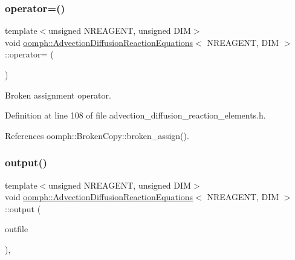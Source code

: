 \subsubsection{\texorpdfstring{operator=()}{operator=()}}
{\footnotesize\ttfamily template$<$unsigned N\+R\+E\+A\+G\+E\+NT, unsigned D\+IM$>$ \\
void \hyperlink{classoomph_1_1AdvectionDiffusionReactionEquations}{oomph\+::\+Advection\+Diffusion\+Reaction\+Equations}$<$ N\+R\+E\+A\+G\+E\+NT, D\+IM $>$\+::operator= (\begin{DoxyParamCaption}\item[{const \hyperlink{classoomph_1_1AdvectionDiffusionReactionEquations}{Advection\+Diffusion\+Reaction\+Equations}$<$ N\+R\+E\+A\+G\+E\+NT, D\+IM $>$ \&}]{ }\end{DoxyParamCaption})\hspace{0.3cm}{\ttfamily [inline]}}



Broken assignment operator. 



Definition at line 108 of file advection\+\_\+diffusion\+\_\+reaction\+\_\+elements.\+h.



References oomph\+::\+Broken\+Copy\+::broken\+\_\+assign().

\mbox{\label{classoomph_1_1AdvectionDiffusionReactionEquations_a70be6733b56f27104a4a849c296b5b62}} 
\subsubsection{\texorpdfstring{output()}{output()}\hspace{0.1cm}{\footnotesize\ttfamily [1/4]}}
{\footnotesize\ttfamily template$<$unsigned N\+R\+E\+A\+G\+E\+NT, unsigned D\+IM$>$ \\
void \hyperlink{classoomph_1_1AdvectionDiffusionReactionEquations}{oomph\+::\+Advection\+Diffusion\+Reaction\+Equations}$<$ N\+R\+E\+A\+G\+E\+NT, D\+IM $>$\+::output (\begin{DoxyParamCaption}\item[{std\+::ostream \&}]{outfile }\end{DoxyParamCaption})\hspace{0.3cm}{\ttfamily [inline]}, {\ttfamily [virtual]}}



